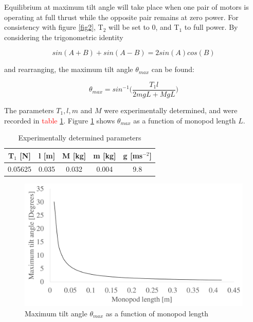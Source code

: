 \documentclass[12pt,a4paper]{article}
\begin{document}
Equilibrium at maximum tilt angle will take place when one pair of motors is operating at full thrust while the opposite pair remains at zero power. For consistency with figure \ref{fig2}, T$_{\text{2}}$ will be set to 0, and T$_{\text{1}}$ to full power. By considering the trigonometric identity

\begin{equation}
sin(A+B)+sin(A-B) = 2sin(A)cos(B)
\end{equation}

and rearranging, the maximum tilt angle $\theta_{max}$ can be found:

\begin{equation}
\theta_{max} = sin^{-1}\Big(\frac{T_1l}{2mgL + MgL}\Big)
\end{equation}

The parameters $T_{1}, l, m$ and $M$ were experimentally determined, and were recorded in \textcolor{red}{table \ref{table1}}. Figure \ref{fig3} shows $\theta_{max}$ as a function of monopod length $L$.


\begin{table}[h!]
\centering
\begin{tabular}{@{}ccccc@{}}
\toprule
T$_{1}$ {[}N{]} & l {[}m{]} & M {[}kg{]} & m {[}kg{]} & g {[}ms$^{-2}${]} \\ \midrule
0.05625         & 0.035     & 0.032      & 0.004      & 9.8               \\ \bottomrule
\end{tabular}
\caption{Experimentally determined parameters}
\label{table1}
\end{table}

\begin{figure}[h!]
\centering
 \includegraphics[scale=0.35]{TiltAngle.pdf}
  \caption{Maximum tilt angle $\theta_{max}$ as a function of monopod length}
  \label{fig3}
\end{figure}
\end{document}
